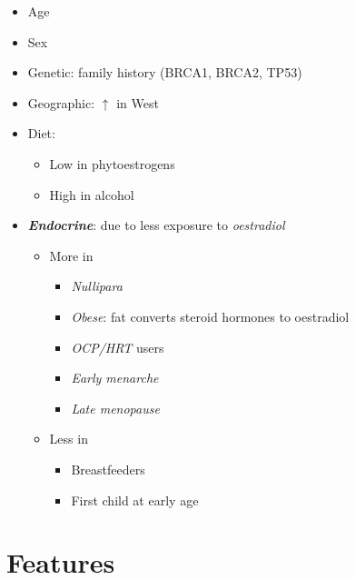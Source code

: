\documentclass[
  14pt,
]{memoir}
\providecommand{\tightlist}{%
  \setlength{\itemsep}{0pt}\setlength{\parskip}{0pt}}
\begin{document}
\begin{itemize}
\tightlist
\item
  Age
\item
  Sex
\item
  Genetic: family history (BRCA1, BRCA2, TP53)
\item
  Geographic: \(\uparrow\) in West
\item
  Diet:

  \begin{itemize}
  \tightlist
  \item
    Low in phytoestrogens
  \item
    High in alcohol
  \end{itemize}
\item
  \textbf{\emph{Endocrine}}: due to less exposure to \emph{oestradiol}

  \begin{itemize}
  \tightlist
  \item
    More in

    \begin{itemize}
    \tightlist
    \item
      \emph{Nullipara}
    \item
      \emph{Obese}: fat converts steroid hormones to oestradiol
    \item
      \emph{OCP/HRT} users
    \item
      \emph{Early menarche}
    \item
      \emph{Late menopause}
    \end{itemize}
  \item
    Less in

    \begin{itemize}
    \tightlist
    \item
      Breastfeeders
    \item
      First child at early age
    \end{itemize}
  \end{itemize}
\end{itemize}

\hypertarget{features-2}{%
\section{Features}\label{features-2}}
\end{document}
